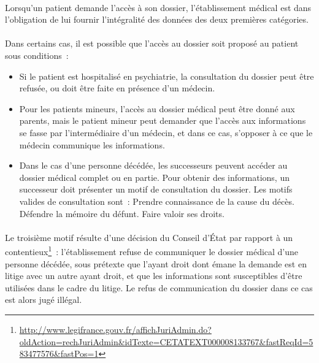 \paragraph{}
Lorsqu'un patient demande l'accès à son dossier, l'établissement médical est dans l'obligation
de lui fournir l'intégralité des données des deux premières catégories.

\paragraph{}
Dans certains cas, il est possible que l'accès au dossier soit proposé au patient sous conditions~:

\begin{itemize}
    \item Si le patient est hospitalisé en psychiatrie, la consultation du
        dossier peut être refusée, ou doit être faite en présence d'un médecin.

    \item Pour les patients mineurs, l'accès au dossier médical peut être donné
        aux parents, mais le patient mineur peut demander que l'accès aux
        informations se fasse par l'intermédiaire d'un médecin, et dans ce cas,
        s'opposer à ce que le médecin communique les informations.

    \item Dans le cas d'une personne décédée, les successeurs peuvent accéder
        au dossier médical complet ou en partie. Pour obtenir des informations,
        un successeur doit présenter un motif de consultation du dossier. Les
        motifs valides de consultation sont~:
            \subitem{\textbullet\,} Prendre connaissance de la cause du décès.
            \subitem{\textbullet\,} Défendre la mémoire du défunt.
            \subitem{\textbullet\,} Faire valoir ses droits.
\end{itemize}

\paragraph{}
Le troisième motif résulte d'une décision du Conseil d'État par rapport à un
contentieux\footnote{\url{http://www.legifrance.gouv.fr/affichJuriAdmin.do?oldAction=rechJuriAdmin&idTexte=CETATEXT000008133767&fastReqId=583477576&fastPos=1}}~:
l'établissement refuse de communiquer le dossier médical d'une personne
décédée, sous prétexte que l'ayant droit dont émane la demande est en litige
avec un autre ayant droit, et que les informations sont susceptibles d'être
utilisées dans le cadre du litige.  Le refus de communication du dossier dans
ce cas est alors jugé illégal.

